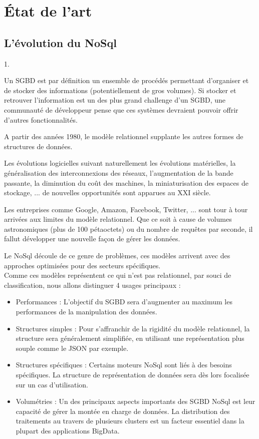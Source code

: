 \documentclass[a4paper,fleqn,12pt]{report}
\begin{document}
\part{État de l'art}

\chapter{L'évolution du NoSql}
\label{NoSqlEvol}


1.

Un SGBD est par définition un ensemble de procédés permettant d'organiser et de stocker des informations (potentiellement de gros volumes). Si stocker et retrouver l'information est un des plus grand challenge d'un SGBD, une communauté de développeur pense que ces systèmes devraient pouvoir offrir d'autres fonctionnalités. 

A partir des années 1980, le modèle relationnel supplante les autres formes de structures de données.

Les évolutions logicielles suivant naturellement les évolutions matérielles, la généralisation des interconnexions des réseaux, l'augmentation de la bande passante, la diminution du coût des machines, la miniaturisation des espaces de stockage, ... de nouvelles opportunités sont apparues au XXI siècle.

Les entreprises comme Google, Amazon, Facebook, Twitter, ... sont tour à tour arrivées aux limites du modèle relationnel. Que ce soit à cause de volumes astronomiques (plus de 100 pétaoctets) ou du nombre de requêtes par seconde, il fallut développer une nouvelle façon de gérer les données.

Le NoSql découle de ce genre de problèmes, ces modèles arrivent avec des approches optimisées pour des secteurs spécifiques. \\
Comme ces modèles représentent ce qui n'est pas relationnel, par souci de classification, nous allons distinguer 4 usages principaux :

\begin{itemize}
\item Performances : L'objectif du SGBD sera d'augmenter au maximum les performances de la manipulation des données. 
\item Structures simples : Pour s’affranchir de la rigidité du modèle relationnel, la structure sera généralement simplifiée, en utilisant une représentation plus souple comme le JSON par exemple.
\item Structures spécifiques : Certains moteurs NoSql sont liés à des besoins spécifiques. La structure de représentation de données sera dès lors focalisée sur un cas d'utilisation.
\item Volumétries : Un des principaux aspects importants des SGBD NoSql est leur capacité de gérer la montée en charge de données. La distribution des traitements au travers de plusieurs clusters est un facteur essentiel dans la plupart des applications BigData.
\end{itemize} 
\end{document}
